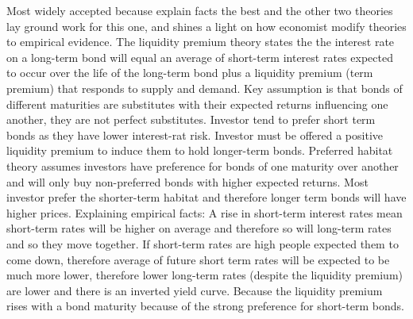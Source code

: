 \documentclass[12pt]{examnotes}
\begin{document}
\ra Most widely accepted because explain facts the best and the other two theories lay ground work for this one, and shines a light on how economist modify theories to empirical evidence.
\ra The liquidity premium theory states the the interest rate on a long-term bond will equal an average of short-term interest rates expected to occur over the life of the long-term bond plus a liquidity premium (term premium) that responds to supply and demand. 
\rna Key assumption is that bonds of different maturities are substitutes with their expected returns influencing one another, they are not perfect substitutes.
\rna Investor tend to prefer short term bonds as they have lower interest-rat risk.
\rna Investor must be offered a positive liquidity premium to induce them to hold longer-term bonds.
\ra Preferred habitat theory assumes investors have preference for bonds of one maturity over another and will only buy non-preferred bonds with higher expected returns.
\rna Most investor prefer the shorter-term habitat and therefore longer  term bonds will have higher prices.
\ra Explaining empirical facts:
 A rise in short-term interest rates mean short-term rates will be higher on average and therefore so will long-term rates and so they move together.
 If short-term rates are high people expected them to come down, therefore average of future short term rates will be expected to be much more lower, therefore lower long-term rates (despite the liquidity premium) are lower and there is an inverted yield curve.
 Because the liquidity premium rises with a bond maturity because of the strong preference for short-term bonds.
\end{document}
